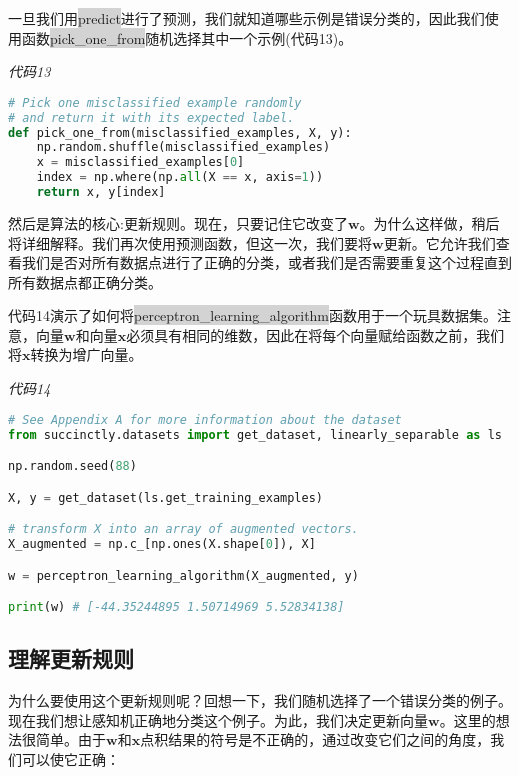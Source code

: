 一旦我们用\colorbox{lightgray}{predict}进行了预测，我们就知道哪些示例是错误分类的，因此我们使用函数\colorbox{lightgray}{pick\_one\_from}随机选择其中一个示例(代码13)。


\emph{代码13}

\begin{lstlisting}[language=python]
# Pick one misclassified example randomly
# and return it with its expected label. 
def pick_one_from(misclassified_examples, X, y): 
    np.random.shuffle(misclassified_examples) 
    x = misclassified_examples[0] 
    index = np.where(np.all(X == x, axis=1)) 
    return x, y[index]

\end{lstlisting}

然后是算法的核心:更新规则。现在，只要记住它改变了$\mathbf{w}$。为什么这样做，稍后将详细解释。我们再次使用预测函数，但这一次，我们要将$\mathbf{w}$更新。它允许我们查看我们是否对所有数据点进行了正确的分类，或者我们是否需要重复这个过程直到所有数据点都正确分类。

代码14演示了如何将\colorbox{lightgray}{perceptron\_learning\_algorithm}函数用于一个玩具数据集。注意，向量$\mathbf{w}$和向量$\mathbf{x}$必须具有相同的维数，因此在将每个向量赋给函数之前，我们将$\mathbf{x}$转换为增广向量。

\emph{代码14}

\begin{lstlisting}[language=python]
# See Appendix A for more information about the dataset 
from succinctly.datasets import get_dataset, linearly_separable as ls 

np.random.seed(88)

X, y = get_dataset(ls.get_training_examples) 

# transform X into an array of augmented vectors.
X_augmented = np.c_[np.ones(X.shape[0]), X] 

w = perceptron_learning_algorithm(X_augmented, y) 

print(w) # [-44.35244895 1.50714969 5.52834138]

\end{lstlisting}

\subsection{理解更新规则}

为什么要使用这个更新规则呢？回想一下，我们随机选择了一个错误分类的例子。现在我们想让感知机正确地分类这个例子。为此，我们决定更新向量$\mathbf{w}$。这里的想法很简单。由于$\mathbf{w}$和$\mathbf{x}$点积结果的符号是不正确的，通过改变它们之间的角度，我们可以使它正确：

